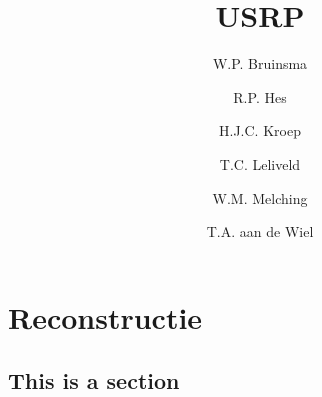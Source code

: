 \documentclass[report, oneside, a4paper, openany]{memoir}
\title{USRP}
\author{W.P. Bruinsma \and R.P. Hes \and H.J.C. Kroep \and T.C. Leliveld \and W.M. Melching \and T.A. aan de Wiel}
\begin{document}
\chapter{Reconstructie}

\section{This is a section}
\end{document}
